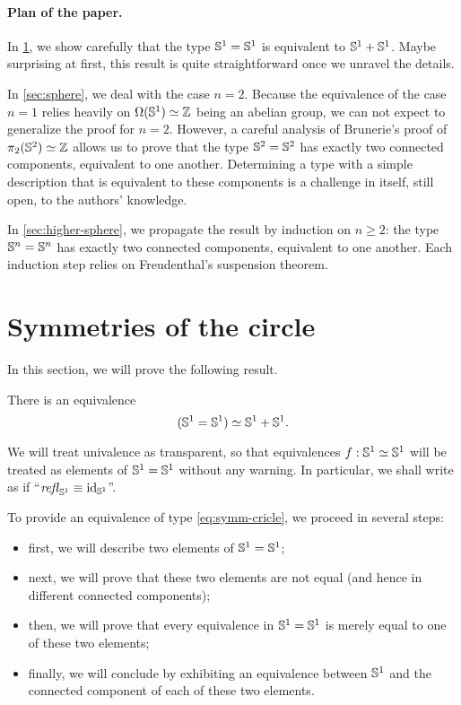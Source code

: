 \documentclass[english,a4]{article}
\begin{document}
\paragraph{Plan of the paper.}%
In \cref{sec:circle-case}, we show carefully that the type ${{\mathbb S^{1}}} = {{\mathbb S^{1}}}$
is equivalent to ${{\mathbb S^{1}}} + {{\mathbb S^{1}}}$. Maybe surprising at first, this result
is quite straightforward once we unravel the details.

In \cref{sec:sphere}, we deal with the case $n=2$. Because the
equivalence of the case $n=1$ relies heavily on $\Omega({{\mathbb S^{1}}})\simeq \mathbb{Z}$
being an abelian group, we can not expect to generalize the proof for
$n=2$. However, a careful analysis of Brunerie's proof of
$\pi_2({{\mathbb S^{2}}}) \simeq \mathbb{Z}$ allows us to prove that the type ${{\mathbb S^{2}}}={{\mathbb S^{2}}}$ has
exactly two connected components, equivalent to one another. 
Determining a type with a simple description that is
equivalent to these components is a challenge in itself, still open,
to the authors' knowledge.

In \cref{sec:higher-sphere}, we propagate the result by induction on
$n\geq 2$: the type ${\mathbb S^{n}} = {\mathbb S^{n}}$ has exactly two connected
components, equivalent to one another. Each induction step relies on
Freudenthal's suspension theorem.

\section{Symmetries of the circle}
\label{sec:circle-case}%

In this section, we will prove the following result.
\begin{theorem}
  There is an equivalence
  \begin{equation}
    \label{eq:symm-cricle}%
    (\Sc = \Sc) \weq \Sc+\Sc.
  \end{equation}
  \label{thm:symmetries-of-S1}
\end{theorem}
We will treat univalence as transparent, so that equivalences
$f:{{\mathbb S^{1}}}\simeq {{\mathbb S^{1}}}$ will be treated as elements of ${{\mathbb S^{1}}}={{\mathbb S^{1}}}$ without any
warning. In particular, we shall write as if
``$\mathop{{\mathit{refl}}_{{{\mathbb S^{1}}}}} \equiv \mathord{\mathrm{id}}_{{\mathbb S^{1}}}$''.

To provide an equivalence of type \cref{eq:symm-cricle}, we proceed
in several steps:
\begin{itemize}
\item first, we will describe two elements of ${{\mathbb S^{1}}}={{\mathbb S^{1}}}$;
\item next, we will prove that these two elements are not equal (and
hence in different connected components);
\item then, we will prove that every equivalence in ${{\mathbb S^{1}}}={{\mathbb S^{1}}}$ is
  merely equal to one of these two elements;
\item finally, we will conclude by exhibiting an equivalence between
  ${{\mathbb S^{1}}}$ and the connected component of each of these two elements.
\end{itemize}
\end{document}
